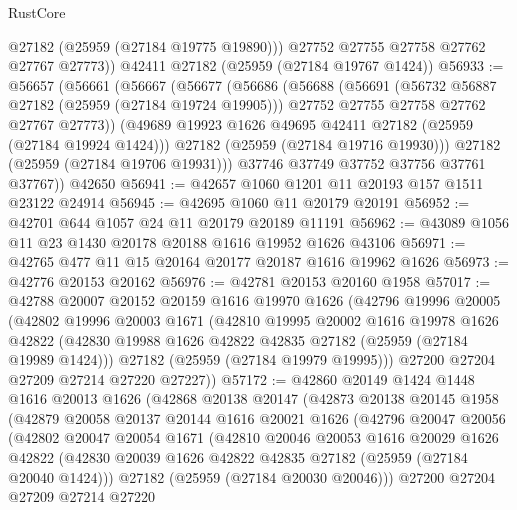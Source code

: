 \begin{lexlean}{RustCore}
\begin{coremodule}
          @27182
          (@25959 (@27184 @19775 @19890)))
        @27752
        @27755
        @27758
        @27762
        @27767
        @27773))
    @42411
    @27182
    (@25959 (@27184 @19767 @1424))
@56933 := @56657
    (@56661
      (@56667
        (@56677
          (@56686
            (@56688
              (@56691
                (@56732 @56887 @27182 (@25959 (@27184 @19724 @19905)))
                @27752
                @27755
                @27758
                @27762
                @27767
                @27773))
            (@49689 @19923 @1626 @49695 @42411 @27182 (@25959 (@27184 @19924 @1424)))
            @27182
            (@25959 (@27184 @19716 @19930)))
          @27182
          (@25959 (@27184 @19706 @19931)))
        @37746
        @37749
        @37752
        @37756
        @37761
        @37767))
    @42650
@56941 := @42657 @1060 @1201 @11 @20193 @157 @1511 @23122 @24914
@56945 := @42695 @1060 @11 @20179 @20191
@56952 := @42701 @644 @1057 @24 @11 @20179 @20189 @11191
@56962 := @43089 @1056 @11 @23 @1430 @20178 @20188 @1616 @19952 @1626 @43106
@56971 := @42765 @477 @11 @15 @20164 @20177 @20187 @1616 @19962 @1626
@56973 := @42776 @20153 @20162
@56976 := @42781 @20153 @20160 @1958
@57017 := @42788
    @20007
    @20152
    @20159
    @1616
    @19970
    @1626
    (@42796
      @19996
      @20005
      (@42802
        @19996
        @20003
        @1671
        (@42810
          @19995
          @20002
          @1616
          @19978
          @1626
          @42822
          (@42830 @19988 @1626 @42822 @42835 @27182 (@25959 (@27184 @19989 @1424)))
          @27182
          (@25959 (@27184 @19979 @19995)))
        @27200
        @27204
        @27209
        @27214
        @27220
        @27227))
@57172 := @42860
    @20149
    @1424
    @1448
    @1616
    @20013
    @1626
    (@42868
      @20138
      @20147
      (@42873
        @20138
        @20145
        @1958
        (@42879
          @20058
          @20137
          @20144
          @1616
          @20021
          @1626
          (@42796
            @20047
            @20056
            (@42802
              @20047
              @20054
              @1671
              (@42810
                @20046
                @20053
                @1616
                @20029
                @1626
                @42822
                (@42830 @20039 @1626 @42822 @42835 @27182 (@25959 (@27184 @20040 @1424)))
                @27182
                (@25959 (@27184 @20030 @20046)))
              @27200
              @27204
              @27209
              @27214
              @27220

\end{coremodule}
\end{lexlean}

